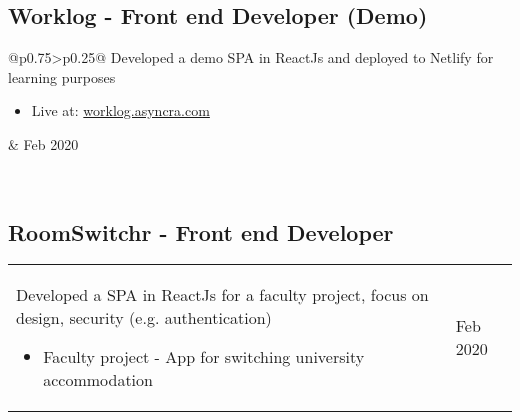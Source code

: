 \documentclass[a4paper]{article}
\makeatletter
\newlength{\tablewidth}
\newenvironment{period}[2]{%
\newcommand{\sarma}{#2}%
\setlength{\tablewidth}{\linewidth}
\addtolength{\tablewidth}{-2\tabcolsep}
\begin{tabular}{@{}p{0.75\tablewidth}>{\raggedleft\arraybackslash}p{0.25\tablewidth}@{}}%
#1 \newline
\begin{itemize}
}{%
\end{itemize} & \sarma \\%
\end{tabular}\\
}
\makeatother
\begin{document}
\subsection{Worklog - Front end Developer (Demo)}
\begin{period}{Developed a demo SPA in ReactJs and deployed to Netlify for learning purposes}{Feb 2020}
\item Live at: \href{https://worklog.asyncra.com}{worklog.asyncra.com}
\end{period}


\subsection{RoomSwitchr - Front end Developer}
\begin{period}{Developed a SPA in ReactJs for a faculty project, focus on design, security (e.g. authentication)}{Sept 2020 - Jan 2021}
\item Faculty project - App for switching university accommodation 
\end{period}

\iffalse

\section{work experience}
No prior work experience in tech field\\

\subsection{Firma d.o.o., Zagreb, Croatia}
\begin{period}{Software Engineering Intern}{Jun 2012 -- Sep 2012}
    \item 
        worked on improving a copyright infringement detection system
        \begin{itemize}
            \item Java, Git, Linux
            \item awarded for having best test code coverage out of all (10) interns
        \end{itemize}
\end{period}
\subsection{University of Zagreb, Faculty of Electrical Engineering and Computing, Croatia}
\begin{period}{Teaching assistant}{Oct 2008 -- May 2009}
    \item Digital Logic
    \item Algorithms and Data Structures
\end{period}
\begin{period}{Team leader}{Sep 2011 -- Jan 2012}
    \item managed a team of 10 students in \textit{Software Design} class project
\end{period}
\fi
\end{document}
